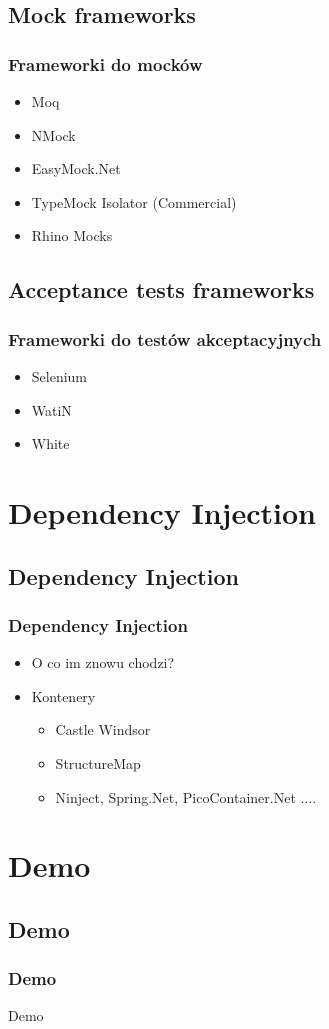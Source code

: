 \documentclass[slidestop,compress,mathserif]{beamer}
\begin{document}
\subsection{Mock frameworks}
\begin{frame}
	\frametitle{Frameworki do mocków}
	\begin{itemize}
		\item{Moq}
		\pause \item{NMock}
		\pause \item{EasyMock.Net}
		\pause \item{TypeMock Isolator (Commercial)}
		\pause \item{Rhino Mocks}
	\end{itemize}
\end{frame}

\subsection{Acceptance tests frameworks}
\begin{frame}
	\frametitle{Frameworki do testów akceptacyjnych}
	\begin{itemize}
		\item{Selenium}
		\pause \item{WatiN}
		\pause \item{White}
	\end{itemize}
\end{frame}

\section{Dependency Injection}
\subsection{Dependency Injection}
\begin{frame}
	\frametitle{Dependency Injection}
	\begin{itemize}
		\pause \item O co im znowu chodzi? %
		\pause \item Kontenery %
		\pause \begin{itemize}
			\item Castle Windsor
			\item StructureMap
			\item Ninject, Spring.Net, PicoContainer.Net ....
		\end{itemize}
	\end{itemize}
\end{frame}
	
\section{Demo}
\subsection{Demo}
\begin{frame}
	\frametitle{Demo}
	\begin{center}
		\huge{Demo}
	\end{center}
\end{frame}
	
	
\end{document}
